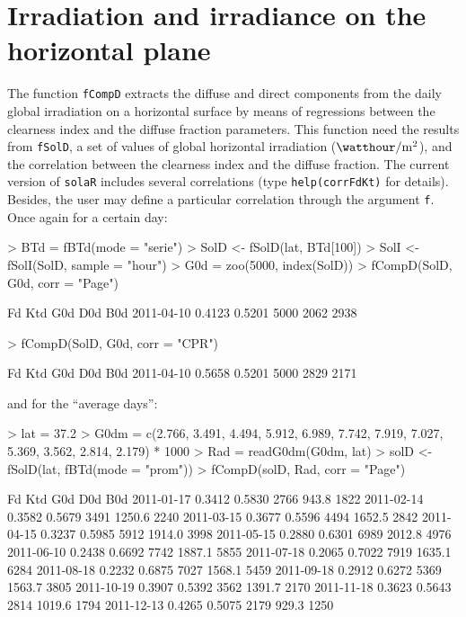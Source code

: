 \documentclass[oldfontcommands,a4paper]{memoir}
\renewenvironment{Schunk}{\vspace{\topsep}}{\vspace{\topsep}}
\begin{document}
\section{Irradiation and irradiance on the horizontal plane}

The function \texttt{fCompD} extracts the diffuse and direct
components from the daily global irradiation on a horizontal surface
by means of regressions between the clearness index and the diffuse
fraction parameters.  This function need the results from
\texttt{fSolD}, a set of values of global horizontal irradiation
($\si{\watthour\per\meter\squared}$), and the correlation between the
clearness index and the diffuse fraction.  The current version of
\texttt{solaR} includes several correlations (type
\texttt{help(corrFdKt)} for details).  Besides, the user may define a
particular correlation through the argument \texttt{f}.  Once again
for a certain day:

\begin{Schunk}
\begin{Sinput}
> BTd = fBTd(mode = "serie")
> SolD <- fSolD(lat, BTd[100])
> SolI <- fSolI(SolD, sample = "hour")
> G0d = zoo(5000, index(SolD))
> fCompD(SolD, G0d, corr = "Page")
\end{Sinput}
\begin{Soutput}
               Fd    Ktd  G0d  D0d  B0d
2011-04-10 0.4123 0.5201 5000 2062 2938
\end{Soutput}
\begin{Sinput}
> fCompD(SolD, G0d, corr = "CPR")
\end{Sinput}
\begin{Soutput}
               Fd    Ktd  G0d  D0d  B0d
2011-04-10 0.5658 0.5201 5000 2829 2171
\end{Soutput}
\end{Schunk}
and for the ``average days'':

\begin{Schunk}
\begin{Sinput}
> lat = 37.2
> G0dm = c(2.766, 3.491, 4.494, 5.912, 6.989, 7.742, 7.919, 7.027, 
     5.369, 3.562, 2.814, 2.179) * 1000
> Rad = readG0dm(G0dm, lat)
> solD <- fSolD(lat, fBTd(mode = "prom"))
> fCompD(solD, Rad, corr = "Page")
\end{Sinput}
\begin{Soutput}
               Fd    Ktd  G0d    D0d  B0d
2011-01-17 0.3412 0.5830 2766  943.8 1822
2011-02-14 0.3582 0.5679 3491 1250.6 2240
2011-03-15 0.3677 0.5596 4494 1652.5 2842
2011-04-15 0.3237 0.5985 5912 1914.0 3998
2011-05-15 0.2880 0.6301 6989 2012.8 4976
2011-06-10 0.2438 0.6692 7742 1887.1 5855
2011-07-18 0.2065 0.7022 7919 1635.1 6284
2011-08-18 0.2232 0.6875 7027 1568.1 5459
2011-09-18 0.2912 0.6272 5369 1563.7 3805
2011-10-19 0.3907 0.5392 3562 1391.7 2170
2011-11-18 0.3623 0.5643 2814 1019.6 1794
2011-12-13 0.4265 0.5075 2179  929.3 1250
\end{Soutput}
\end{Schunk}
\end{document}
